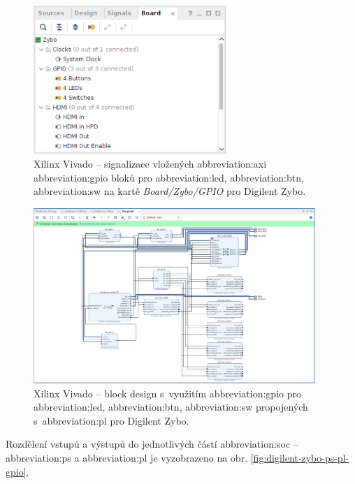 \documentclass[a4paper, twoside, 11pt]{article}
\begin{document}
\begin{appendices}
		\begin{figure}[htbp!]
			\centering
			\includegraphics[width=0.65\textwidth]{src/png/zybo-xilinx-vivado-flow/zybo-xilinx-vivado-flow-38.jpg}
			\caption{Xilinx Vivado – signalizace vložených \gls{abbreviation:axi} \gls{abbreviation:gpio} bloků pro \gls{abbreviation:led}, \gls{abbreviation:btn}, \gls{abbreviation:sw} na kartě \textit{Board/Zybo/GPIO} pro Digilent Zybo.}
			\label{fig:zybo-xilinx-vivado-flow-38}
		\end{figure}

		\begin{figure}[htbp!]
			\centering
			\includegraphics[width=0.95\textwidth]{src/png/zybo-xilinx-vivado-flow/zybo-xilinx-vivado-flow-37.jpg}
			\caption{Xilinx Vivado – block design s~využitím \gls{abbreviation:gpio} pro \gls{abbreviation:led}, \gls{abbreviation:btn}, \gls{abbreviation:sw} propojených s~\gls{abbreviation:pl} pro Digilent Zybo.}
			\label{fig:zybo-xilinx-vivado-flow-37}
		\end{figure}

		Rozdělení vstupů a výstupů do jednotlivých částí \gls{abbreviation:soc} – \gls{abbreviation:ps} a \gls{abbreviation:pl} je vyzobrazeno na obr. \ref{fig:digilent-zybo-ps-pl-gpio}.


\end{appendices}
\end{document}
